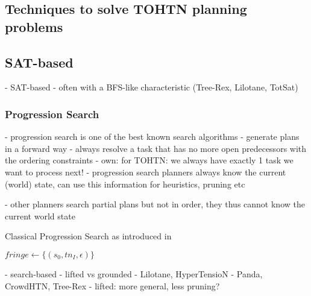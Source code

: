 \subsection{Techniques to solve TOHTN planning problems}

\subsection{SAT-based}
- SAT-based
- often with a BFS-like characteristic (Tree-Rex, Lilotane, TotSat)

\subsubsection{Progression Search}
\cite{holler2020htn}
	- progression search is one of the best known search algorithms
	- generate plans in a forward way
	- always resolve a task that has no more open predecessors with the ordering constraints
		- own: for TOHTN: we always have exactly 1 task we want to process next!
	- progression search planners always know the current (world) state, can use this information for heuristics, pruning etc
	
	- other planners search partial plans but not in order, they thus cannot know the current world state
	
\begin{algorithm}
	\caption{Classical Progression Search as introduced in \cite{holler2020htn}}
	$fringe \gets \{ (s_0, tn_I, \epsilon)\}$\;
\end{algorithm}

- search-based
- lifted vs grounded
	- Lilotane, HyperTensioN
	- Panda, CrowdHTN, Tree-Rex
	- lifted: more general, less pruning?